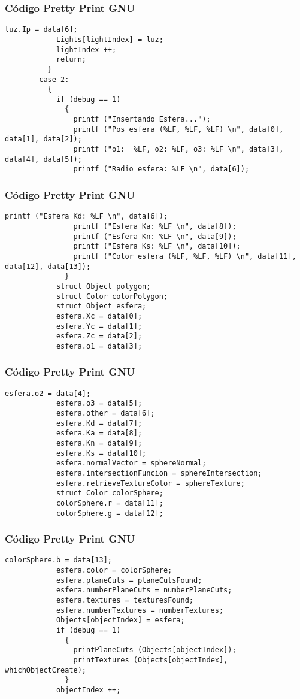 \documentclass{beamer}
\begin{document}
\begin{frame}[fragile]
\frametitle{C\'odigo Pretty Print GNU}
\begin{lstlisting}[style=CStyle]
            luz.Ip = data[6];
            Lights[lightIndex] = luz;
            lightIndex ++;
            return;
          }
        case 2:
          {
            if (debug == 1)
              {
                printf ("Insertando Esfera...");
                printf ("Pos esfera (%LF, %LF, %LF) \n", data[0], data[1], data[2]);
                printf ("o1:  %LF, o2: %LF, o3: %LF \n", data[3], data[4], data[5]);
                printf ("Radio esfera: %LF \n", data[6]);
\end{lstlisting}
\end{frame}
\begin{frame}[fragile]
\frametitle{C\'odigo Pretty Print GNU}
\begin{lstlisting}[style=CStyle]
                printf ("Esfera Kd: %LF \n", data[6]);
                printf ("Esfera Ka: %LF \n", data[8]);
                printf ("Esfera Kn: %LF \n", data[9]);
                printf ("Esfera Ks: %LF \n", data[10]);
                printf ("Color esfera (%LF, %LF, %LF) \n", data[11], data[12], data[13]);
              }
            struct Object polygon;
            struct Color colorPolygon;
            struct Object esfera;
            esfera.Xc = data[0];
            esfera.Yc = data[1];
            esfera.Zc = data[2];
            esfera.o1 = data[3];
\end{lstlisting}
\end{frame}
\begin{frame}[fragile]
\frametitle{C\'odigo Pretty Print GNU}
\begin{lstlisting}[style=CStyle]
            esfera.o2 = data[4];
            esfera.o3 = data[5];
            esfera.other = data[6];
            esfera.Kd = data[7];
            esfera.Ka = data[8];
            esfera.Kn = data[9];
            esfera.Ks = data[10];
            esfera.normalVector = sphereNormal;
            esfera.intersectionFuncion = sphereIntersection;
            esfera.retrieveTextureColor = sphereTexture;
            struct Color colorSphere;
            colorSphere.r = data[11];
            colorSphere.g = data[12];
\end{lstlisting}
\end{frame}
\begin{frame}[fragile]
\frametitle{C\'odigo Pretty Print GNU}
\begin{lstlisting}[style=CStyle]
            colorSphere.b = data[13];
            esfera.color = colorSphere;
            esfera.planeCuts = planeCutsFound;
            esfera.numberPlaneCuts = numberPlaneCuts;
            esfera.textures = texturesFound;
            esfera.numberTextures = numberTextures;
            Objects[objectIndex] = esfera;
            if (debug == 1)
              {
                printPlaneCuts (Objects[objectIndex]);
                printTextures (Objects[objectIndex], whichObjectCreate);
              }
            objectIndex ++;
\end{lstlisting}
\end{frame}
\end{document}
